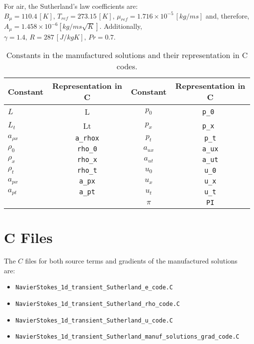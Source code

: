 \documentclass[10pt]{article}
\begin{document}
For air, the Sutherland's law coefficients are: $B_\mu   = 110.4 \, [K], \, T_{ref} = 273.15 \, [K],  \, \mu_{ref} = 1.716\times 10^{-5}\, [kg/ms]$ and, therefore, $A_\mu=1.458\times 10^{-6} [kg /ms\sqrt{K}]$. Additionally, $\gamma  = 1.4 ,\, R = 287 \, [J/kg K],\, Pr  = 0.7$. 
\begin{table}[hptb]
\caption{Constants in the manufactured solutions and their representation in C codes.}
\centering
\begin{tabular}{l c | c c}
\hline\hline
 Constant     & Representation in C &  Constant     & Representation in C \\ [0.25ex]
\hline 
$L$			  & L	   				& $ p_{0}$ 	& \texttt{p\_0 }  \\
$ L_{t}$ 	  & Lt	   				&$ p_{x}$ 	& \texttt{p\_x }  \\
$ a_{\rho x}$ & \texttt{a\_rhox}	&$ p_{t}$   & \texttt{p\_t}   \\
$ \rho_{0}$   & \texttt{rho\_0}		& $ a_{ux}$ & \texttt{a\_ux}  \\    
$ \rho_{x}$   & \texttt{rho\_x}		& $ a_{ut}$ & \texttt{a\_ut}  \\ 
$ \rho_{t}$   & \texttt{rho\_t}     & $ u_{0}$ 	& \texttt{u\_0}   \\ 
$ a_{px}$ 	  & \texttt{a\_px}  	& $ u_{x}$ 	& \texttt{u\_x}   \\ 
$ a_{pt}$ 	  & \texttt{a\_pt}    	& $ u_{t}$ 	& \texttt{u\_t}   \\
			  &			 		  	& $\pi$     & \texttt{PI}     \\
\hline
\end{tabular}
\label{table_aux_var02}
\end{table}




\section{C Files}
The $C$ files for both source terms and gradients of the  manufactured solutions are:
\begin{itemize}
 \item \texttt{NavierStokes\_1d\_transient\_Sutherland\_e\_code.C} \vspace{-6pt}
 \item \texttt{NavierStokes\_1d\_transient\_Sutherland\_rho\_code.C}\vspace{-6pt}
 \item \texttt{NavierStokes\_1d\_transient\_Sutherland\_u\_code.C}\vspace{-6pt}
 \item \texttt{NavierStokes\_1d\_transient\_Sutherland\_manuf\_solutions\_grad\_code.C}
\end{itemize}
\end{document}
